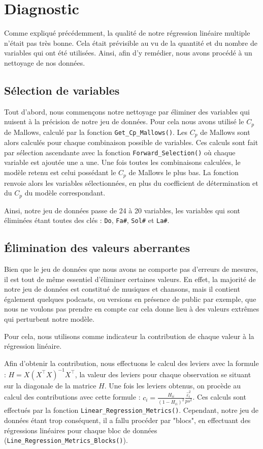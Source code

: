 \documentclass[a4paper, 12pt]{report}
\newcommand{\pythoninline}[1]{\texttt{#1}}
\begin{document}
\section{Diagnostic}

Comme expliqué précédemment, la qualité de notre régression linéaire multiple n'était pas très bonne. Cela était prévisible au vu de la quantité et du nombre de variables qui ont été utilisées. Ainsi, afin d'y remédier, nous avons procédé à un nettoyage de nos données.

\subsection{Sélection de variables}

Tout d'abord, nous commençons notre nettoyage par éliminer des variables qui nuisent à la précision de notre jeu de données. Pour cela nous avons utilisé le \(C_p\) de Mallows, calculé par la fonction \pythoninline{Get_Cp_Mallows()}. Les \(C_p\) de Mallows sont alors calculés pour chaque combinaison possible de variables. Ces calculs sont fait par sélection ascendante avec la fonction  \pythoninline{Forward_Selection()} où chaque variable est ajoutée une a une. Une fois toutes les combinaisons calculées, le modèle retenu est celui possédant le \(C_p\) de Mallows le plus bas. La fonction renvoie alors les variables sélectionnées, en plus du coefficient de détermination et du \(C_p\) du modèle correspondant. 

Ainsi, notre jeu de données passe de 24 à 20 variables, les variables qui sont éliminées étant toutes des clés : \verb|Do|, \verb|Fa#|, \verb|Sol#| et \verb|La#|.

\subsection{Élimination des valeurs aberrantes}

Bien que le jeu de données que nous avons ne comporte pas d'erreurs de mesures, il est tout de même essentiel d'éliminer certaines valeurs. En effet, la majorité de notre jeu de données est constitué de musiques et chansons, mais il contient également quelques podcasts, ou versions en présence de public par exemple, que nous ne voulons pas prendre en compte car cela donne lieu à des valeurs extrêmes qui perturbent notre modèle.

Pour cela, nous utilisons comme indicateur la contribution de chaque valeur à la régression linéaire.

Afin d'obtenir la contribution, nous effectuons le calcul des leviers avec la formule : \(H = X (X^\top X)^{-1}X^\top\), la valeur des leviers pour chaque observation se situant sur la diagonale de la matrice \(H\). Une fois les leviers obtenus, on procède  au calcul des contributions avec cette formule : \(c_i = \frac{H_{ii}}{(1 - H_{ii})^2}\frac{\hat \varepsilon_i^2}{p s^2}\). Ces calculs sont effectués par la fonction \pythoninline{Linear_Regression_Metrics()}. Cependant, notre jeu de données étant trop conséquent, il a fallu procéder par "blocs", en effectuant des régressions linéaires pour chaque bloc de données (\pythoninline{Line_Regression_Metrics_Blocks()}).
\end{document}
